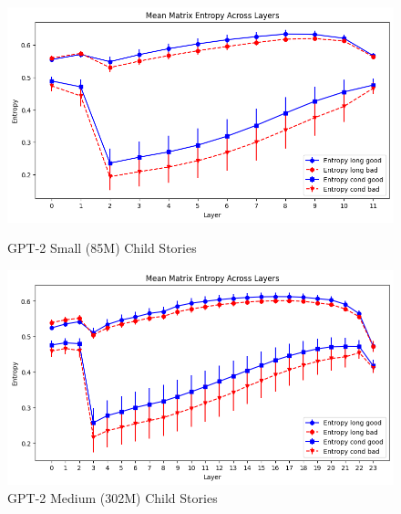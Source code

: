 \documentclass{article}
\begin{document}
\begin{figure} [H]
    \centering
    \begin{minipage}{0.5\linewidth}
        \includegraphics[width=\linewidth]{Small_Child_Stories.png}
        \caption{GPT-2 Small (85M) Child Stories}
        \label{fig:small_child_stories}
    \end{minipage}\hfill
    \begin{minipage}{0.5\linewidth}
        \includegraphics[width=\linewidth]{Medium_Child_Stories.png}
        \caption{GPT-2 Medium (302M) Child Stories}
        \label{fig:medium_child_stories}
    \end{minipage}\hfill
\end{figure}
\end{document}
